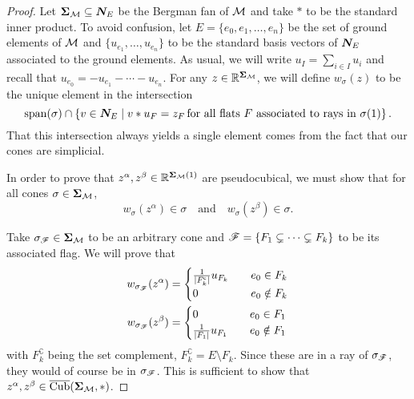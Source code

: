\documentclass[12pt,oneside]{../../sfsuthesis}
\begin{document}
\begin{proof}
    Let \( {\bm{\Sigma}}_{\mathcal{M}} \subseteq \bm{N}_E \) be the Bergman fan of \( \mathcal{M} \) and take \( \ast \) to be the standard inner product.
    To avoid confusion, let \( E = \{ e_0, e_1, \dots, e_n \} \) be the set of ground elements of \( \mathcal{M} \) and \( \{ u_{e_1}, \dots, u_{e_n} \} \) to be the standard basis vectors of \( \bm{N}_E \) associated to the ground elements.
    As usual, we will write \( u_I = \sum_{i \in I} u_i \) and recall that \( u_{e_0} = -u_{e_1} - \cdots - u_{e_n} \).
    For any \( z \in \mathbb{R}^{{\bm{\Sigma}}_{\mathcal{M}}} \), we will define \( w_{\sigma}(z) \) to be the unique element in the intersection
    \[
        \operatorname{span}(\sigma) \cap \left\{ v \in \bm{N}_E \; \middle| \; v \ast u_F = z_F \, \text{for all flats \( F \) associated to rays in \( \sigma(1) \)} \right\}.
    \]
    That this intersection always yields a single element comes from the fact that our cones are simplicial.

    In order to prove that \( z^\alpha, z^\beta \in \mathbb{R}^{{\bm{\Sigma}}_{\mathcal{M}}(1)} \) are pseudocubical, we must show that for all cones \( \sigma \in {\bm{\Sigma}}_{\mathcal{M}} \),
    \[
        w_\sigma(z^\alpha) \in \sigma \quad \text{and} \quad w_\sigma(z^\beta) \in \sigma.
    \]

    Take \( \sigma_{\mathscr{F}} \in {\bm{\Sigma}}_{\mathcal{M}} \) to be an arbitrary cone and \( \mathscr{F} = \{ F_1 \subsetneq \cdots \subsetneq F_k \} \) to be its associated flag.
    We will prove that
    \begin{align*}
        w_{\sigma_{\mathscr{F}}}(z^\alpha) & = \begin{cases}
                                           \frac{1}{|F_k^{\mathsf{c}}|}u_{F_k} & \quad e_0 \in F_k    \\
                                           0                                  & \quad e_0 \notin F_k
                                       \end{cases}
        \\
        w_{\sigma_{\mathscr{F}}}(z^\beta)  & = \begin{cases}
                                           0                      & \quad e_0 \in F_1    \\
                                           \frac{1}{|F_1|}u_{F_1} & \quad e_0 \notin F_1
                                       \end{cases}
    \end{align*}
    with \( F_k^\complement \) being the set complement, \( F_k^\complement = E \setminus F_k \).
    Since these are in a ray of \( \sigma_{\mathscr{F}} \), they would of course be in \( \sigma_{\mathscr{F}} \).
    This is sufficient to show that \(  z^\alpha, z^\beta \in \operatorname{\overline{Cub}}({\bm{\Sigma}}_{\mathcal{M}}, \ast) \).


\end{proof}
\end{document}
